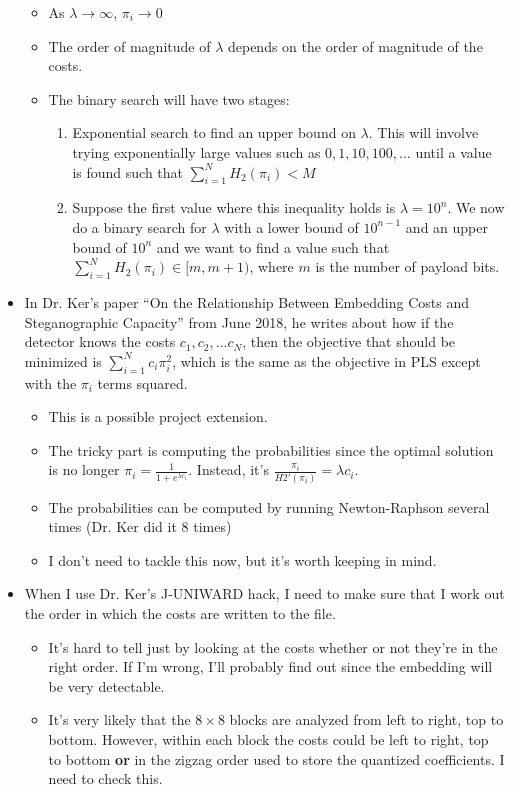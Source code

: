 \documentclass[11pt,a4paper]{report}
\begin{document}
\begin{itemize}
\begin{itemize}
  \item As $\lambda \rightarrow \infty$, $\pi_i \rightarrow 0$

  \item The order of magnitude of $\lambda$ depends on the order of magnitude of the costs.

  \item The binary search will have two stages:
    \begin{enumerate}
    \item Exponential search to find an upper bound on $\lambda$. This will involve trying exponentially large values such as $0, 1, 10, 100, ...$ until a value is found such that $\sum\limits_{i=1}^N H_2(\pi_i) < M$
    \item Suppose the first value where this inequality holds is $\lambda = 10^n$. We now do a binary search for $\lambda$ with a lower bound of $10^{n-1}$ and an upper bound of $10^n$ and we want to find a value such that $\sum\limits_{i=1}^N H_2(\pi_i) \in [m, m+1)$, where $m$ is the number of payload bits.
    \end{enumerate}
  \end{itemize}
  
\item In Dr. Ker's paper ``On the Relationship Between Embedding Costs and Steganographic Capacity'' from June 2018, he writes about how if the detector knows the costs $c_1, c_2, ... c_N$, then the objective that should be minimized is $\sum\limits_{i=1}^N c_i \pi_i^2$, which is the same as the objective in PLS except with the $\pi_i$ terms squared.
  \begin{itemize}
  \item This is a possible project extension.

  \item The tricky part is computing the probabilities since the optimal solution is no longer $\pi_i = \frac{1}{1+e^{\lambda c_i}}$. Instead, it's $\frac{\pi_i}{H2'(\pi_i)} = \lambda c_i$.

  \item The probabilities can be computed by running Newton-Raphson several times (Dr. Ker did it 8 times)

  \item I don't need to tackle this now, but it's worth keeping in mind.
  \end{itemize}

\item When I use Dr. Ker's J-UNIWARD hack, I need to make sure that I work out the order in which the costs are written to the file.
  \begin{itemize}
  \item It's hard to tell just by looking at the costs whether or not they're in the right order. If I'm wrong, I'll probably find out since the embedding will be very detectable.
  \item It's very likely that the $8\times8$ blocks are analyzed from left to right, top to bottom. However, within each block the costs could be left to right, top to bottom \textbf{or} in the zigzag order used to store the quantized coefficients. I need to check this.
  \end{itemize}


\end{itemize}
\end{document}

